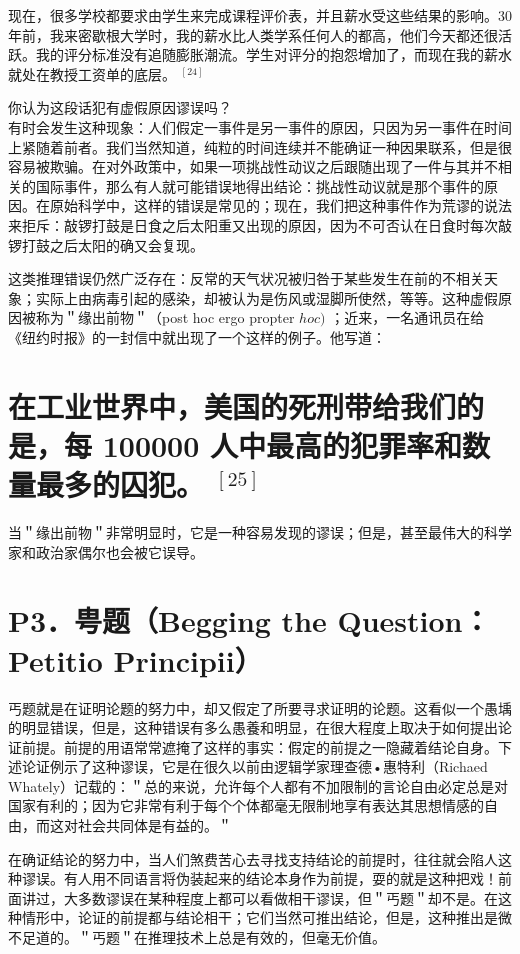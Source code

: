 现在，很多学校都要求由学生来完成课程评价表，并且薪水受这些结果的影响。30年前，我来密歇根大学时，我的薪水比人类学系任何人的都高，他们今天都还很活跃。我的评分标准没有追随膨胀潮流。学生对评分的抱怨增加了，而现在我的薪水就处在教授工资单的底层。 ${ }^{[24]}$

你认为这段话犯有虚假原因谬误吗？\\
有时会发生这种现象：人们假定一事件是另一事件的原因，只因为另一事件在时间上紧随着前者。我们当然知道，纯粒的时间连续并不能确证一种因果联系，但是很容易被欺骗。在对外政策中，如果一项挑战性动议之后跟随出现了一件与其并不相关的国际事件，那么有人就可能错误地得出结论：挑战性动议就是那个事件的原因。在原始科学中，这样的错误是常见的；现在，我们把这种事件作为荒谬的说法来拒斥：敲锣打鼓是日食之后太阳重又出现的原因，因为不可否认在日食时每次敲锣打鼓之后太阳的确又会复现。

这类推理错误仍然广泛存在：反常的天气状况被归咎于某些发生在前的不相关天象；实际上由病毒引起的感染，却被认为是伤风或湿脚所使然，等等。这种虚假原因被称为＂缘出前物＂（post hoc ergo propter $h o c)$ ；近来，一名通讯员在给《纽约时报》的一封信中就出现了一个这样的例子。他写道：

\section*{在工业世界中，美国的死刑带给我们的是，每 100000 人中最高的犯罪率和数量最多的囚犯。 ${ }^{[25]}$}
当＂缘出前物＂非常明显时，它是一种容易发现的谬误；但是，甚至最伟大的科学家和政治家偶尔也会被它误导。

\section*{P3．甹题（Begging the Question：Petitio Principii）}
丐题就是在证明论题的努力中，却又假定了所要寻求证明的论题。这看似一个愚㙖的明显错误，但是，这种错误有多么愚養和明显，在很大程度上取决于如何提出论证前提。前提的用语常常遮掩了这样的事实：假定的前提之一隐藏着结论自身。下述论证例示了这种谬误，它是在很久以前由逻辑学家理查德•惠特利（Richaed Whately）记载的：＂总的来说，允许每个人都有不加限制的言论自由必定总是对国家有利的；因为它非常有利于每个个体都毫无限制地享有表达其思想情感的自由，而这对社会共同体是有益的。＂

在确证结论的努力中，当人们煞费苦心去寻找支持结论的前提时，往往就会陷人这种谬误。有人用不同语言将伪装起来的结论本身作为前提，耍的就是这种把戏！前面讲过，大多数谬误在某种程度上都可以看做相干谬误，但＂丐题＂却不是。在这种情形中，论证的前提都与结论相干；它们当然可推出结论，但是，这种推出是微不足道的。＂丐题＂在推理技术上总是有效的，但毫无价值。


